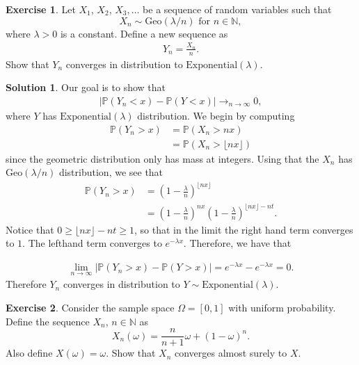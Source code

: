 \documentclass[12pt]{article}
\newcommand{\bbN}{\mathbb{N}}
\newcommand{\Prob}{\mathbb{P}}
\newcommand{\abs}[1]{ \left| #1 \right| }
\theoremstyle{definition}
\newtheorem{exer}{Exercise}
\newtheorem{sol}{Solution}
\theoremstyle{remark}
\begin{document}
\begin{exer}
    Let $X_{1}$, $X_{2}$, $X_{3}, \ldots$ be a sequence of random variables such that
    \begin{equation*}
        X_{n} \sim \text{Geo}(\lambda / n) \text{ for } n \in \bbN, 
    \end{equation*}
    where $\lambda > 0$ is a constant. Define a new sequence as 
    \begin{align*}
    Y_{n} = \frac{X_{n}}{n}.
    \end{align*}
    Show that $Y_{n}$ converges in distribution to $\text{Exponential}(\lambda)$.
\end{exer}

\begin{sol}
    Our goal is to show that
    \begin{align*}
    \abs{\Prob(Y_{n} < x) - \Prob(Y < x)} \rightarrow_{n \to \infty} 0,
    \end{align*}
    where $Y$ has $\text{Exponential}(\lambda)$ distribution. We begin by computing
    \begin{align*}
        \Prob(Y_{n} > x) &= \Prob(X_{n} > nx)\\
                         &= \Prob(X_{n} > \lfloor nx \rfloor)
    \end{align*}
    since the geometric distribution only has mass at integers. Using that the $X_{n}$ has $\text{Geo}(\lambda / n)$ distribution, we see that
     \begin{align*}
         \Prob(Y_{n} > x) &= \left(1 - \frac{\lambda}{n}\right)^{\lfloor nx \rfloor}\\ 
                          &= \left(1 - \frac{\lambda}{n}\right)^{nx} \left(1 - \frac{\lambda}{n}\right)^{\lfloor nx \rfloor - nt}.
    \end{align*}
    Notice that $0\geq \lfloor nx \rfloor - nt \geq 1$, so that in the limit the right hand term converges to $1$. The lefthand term converges to $e^{-\lambda x}$. Therefore, we have that

    \begin{align*}
        \lim_{n\to \infty} \abs{\Prob(Y_{n} > x) - \Prob(Y > x)} = e^{-\lambda x} - e^{-\lambda x} = 0.
    \end{align*}
    Therefore $Y_{n}$ converges in distribution to $Y \sim \text{Exponential}(\lambda)$.
\end{sol}

\newpage

\begin{exer}
    Consider the sample space $\Omega = [0,1]$ with uniform probability. Define the sequence $X _{n}$, $n\in\bbN$ as
    \begin{equation*}
        X_{n}(\omega) = \frac{n}{n+1} \omega + (1 - \omega)^{n}.
    \end{equation*}
    Also define $X(\omega) = \omega$. Show that $X_{n}$ converges almost surely to $X$.
\end{exer}
\end{document}
